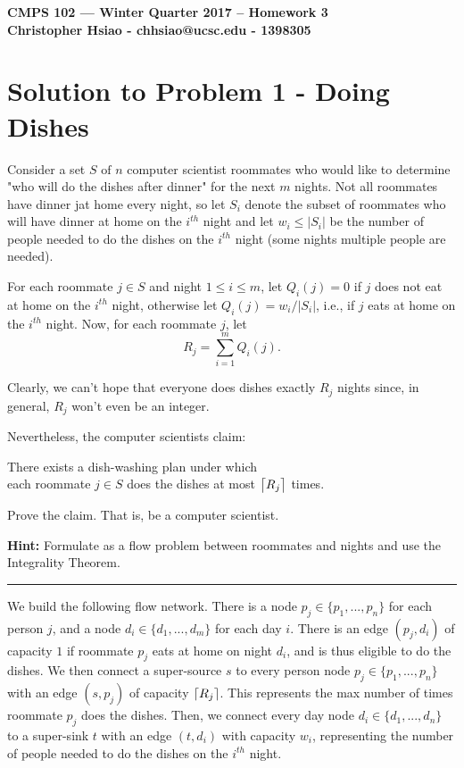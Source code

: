 \documentclass[11pt]{article}
\DeclarePairedDelimiter\ceil{\lceil}{\rceil}
\begin{document}
\begin{center}
{\bf\Large CMPS 102 --- Winter Quarter 2017 --  Homework 3}\\
{\bf Christopher Hsiao - chhsiao@ucsc.edu - 1398305}
\end{center}

\section*{Solution to Problem 1 - Doing Dishes}

Consider a set $S \text{ of } n$ computer scientist roommates who would like to determine "who will do the dishes after dinner" for the next $m$ nights. Not all roommates have dinner jat home every night, so let $S_i$ denote the subset of roommates who will have dinner at home on the $i^{th}$ night and let $w_i \leq |S_i|$ be the number of people needed to do the dishes on the $i^{th}$ night (some nights multiple people are needed).

For each roommate $j \in S$ and night $1 \leq i \leq m$, let $Q_i(j) = 0$ if $j$ does not eat at home on the $i^{th}$ night, otherwise let $Q_i(j) = w_i/|S_i|$, i.e., if $j$ eats at home on the $i^{th}$ night. Now, for each roommate $j$, let
\begin{equation}
	R_j = \sum_{i=1}^{m} Q_i(j) .
\end{equation}

Clearly, we can't hope that everyone does dishes exactly $R_j$ nights since, in general, $R_j$ won't even be an integer.

Nevertheless, the computer scientists claim:
\begin{center}
	There exists a dish-washing plan under which\\
	each roommate $j \in S$ does the dishes at most $\ceil[\big]{R_j}$ times.
\end{center}

Prove the claim. That is, be a computer scientist.

\textbf{Hint:} Formulate as a flow problem between roommates and nights and use the Integrality Theorem.

\noindent\rule{17cm}{0.4pt}

We build the following flow network. There is a node $p_j \in \{p_1, ..., p_n\}$ for each person $j$, and a node $d_i \in \{d_1, ..., d_m\}$ for each day $i$. There is an edge $(p_j, d_i)$ of capacity $1$ if roommate $p_j$ eats at home on night $d_i$, and is thus eligible to do the dishes. We then connect a super-source $s$ to every person node $p_j \in \{p_1, ..., p_n\}$ with an edge $(s, p_j)$ of capacity $\ceil{R_j}$. This represents the max number of times roommate $p_j$ does the dishes. Then, we connect every day node $d_i \in \{d_1, ..., d_n\}$ to a super-sink $t$ with an edge $(t, d_i)$ with capacity $w_i$, representing the number of people needed to do the dishes on the $i^{th}$ night.
\end{document}
